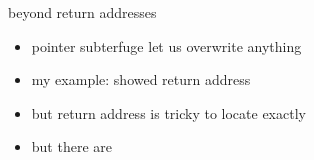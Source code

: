 \begin{frame}{beyond return addresses}
    \begin{itemize}
    \item pointer subterfuge let us overwrite anything
    \item my example: showed return address
    \item but return address is tricky to locate exactly
    \item but there are 
    \end{itemize}
\end{frame}
